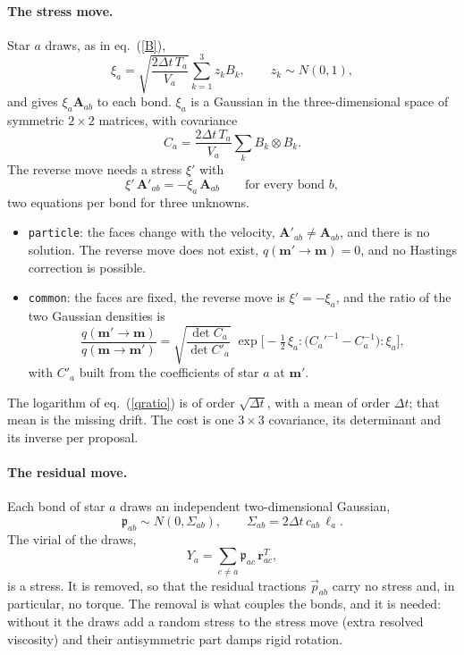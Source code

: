 \documentclass[11pt,aps,preprint,nofootinbib,superscriptaddress,tightenlines]{revtex4-2}
\def\st{\begin{equation}}
\def\stp{\end{equation}}
\def\Eq#1{eq.~(\ref{#1})}
\let\oldparagraph\paragraph
\renewcommand{\paragraph}{\par\bigskip\oldparagraph}
\begin{document}
\paragraph{The stress move.}  Star $a$ draws, as in \Eq{B},
\st
\xi_a=\sqrt{\frac{2\Delta t\,T_a}{V_a}}\sum_{k=1}^3z_kB_k,\qquad z_k\sim N(0,1),
\stp
and gives $\xi_a\bm A_{ab}$ to each bond.  $\xi_a$ is a Gaussian in the three-dimensional space of symmetric $2\times2$ matrices,
with covariance
\st
C_a=\frac{2\Delta t\,T_a}{V_a}\sum_kB_k\otimes B_k .
\stp
The reverse move needs a stress $\xi'$ with
\st
\xi'\,\bm A'_{ab}=-\xi_a\,\bm A_{ab}\qquad\text{for every bond } b ,
\stp
two equations per bond for three unknowns.
\begin{itemize}
\item \texttt{particle}: the faces change with the velocity, $\bm A'_{ab}\neq\bm A_{ab}$, and there is no solution.  The reverse move
  does not exist, $q(\bm m'\to\bm m)=0$, and no Hastings correction is possible.
\item \texttt{common}: the faces are fixed, the reverse move is $\xi'=-\xi_a$, and the ratio of the two Gaussian densities is
  \st
  \frac{q(\bm m'\to\bm m)}{q(\bm m\to\bm m')}=\sqrt{\frac{\det C_a}{\det C'_a}}\;
  \exp\Big[-\tfrac12\,\xi_a{:}\big(C_a'^{-1}-C_a^{-1}\big){:}\xi_a\Big] ,
  \label{qratio}
  \stp
  with $C'_a$ built from the coefficients of star $a$ at $\bm m'$.
\end{itemize}
The logarithm of \Eq{qratio} is of order $\sqrt{\Delta t}$, with a mean of order $\Delta t$; that mean is the missing drift.  The cost
is one $3\times3$ covariance, its determinant and its inverse per proposal.

\paragraph{The residual move.}  Each bond of star $a$ draws an independent two-dimensional Gaussian,
\st
\mathfrak p_{ab}\sim N(0,\Sigma_{ab}),\qquad \Sigma_{ab}=2\Delta t\,c_{ab}\,\ell_a .
\stp
The virial of the draws,
\st
Y_a=\sum_{c\neq a}\mathfrak p_{ac}\,\bm r_{ac}^T ,
\stp
is a stress.  It is removed, so that the residual tractions $\vec p_{ab}$ carry no stress and, in particular, no torque.  The removal is
what couples the bonds, and it is needed: without it the draws add a random stress to the stress move (extra resolved viscosity) and
their antisymmetric part damps rigid rotation.
\end{document}
